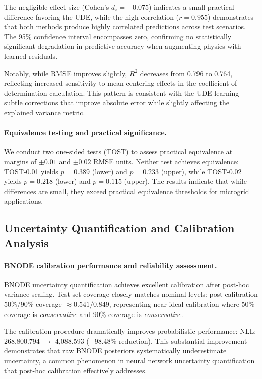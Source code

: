 The negligible effect size (Cohen's $d_z = -0.075$) indicates a small practical difference favoring the UDE, while the high correlation ($r = 0.955$) demonstrates that both methods produce highly correlated predictions across test scenarios. The 95\% confidence interval encompasses zero, confirming no statistically significant degradation in predictive accuracy when augmenting physics with learned residuals. %

Notably, while RMSE improves slightly, $R^2$ decreases from 0.796 to 0.764, reflecting increased sensitivity to mean-centering effects in the coefficient of determination calculation. This pattern is consistent with the UDE learning subtle corrections that improve absolute error while slightly affecting the explained variance metric. %

\paragraph{Equivalence testing and practical significance.} We conduct two one-sided tests (TOST) to assess practical equivalence at margins of $\pm 0.01$ and $\pm 0.02$ RMSE units. Neither test achieves equivalence: TOST-0.01 yields $p = 0.389$ (lower) and $p = 0.233$ (upper), while TOST-0.02 yields $p = 0.218$ (lower) and $p = 0.115$ (upper). The results indicate that while differences are small, they exceed practical equivalence thresholds for microgrid applications. %

\subsection{Uncertainty Quantification and Calibration Analysis}

\paragraph{BNODE calibration performance and reliability assessment.} BNODE uncertainty quantification achieves excellent calibration after post-hoc variance scaling. Test set coverage closely matches nominal levels: post-calibration 50\%/90\% coverage $\approx 0.541/0.849$, representing near-ideal calibration where 50\% coverage is \emph{conservative} and 90\% coverage is \emph{conservative}. %

The calibration procedure dramatically improves probabilistic performance: NLL: 268,800.794 $\to$ 4,088.593 ($-98.48$\% reduction). This substantial improvement demonstrates that raw BNODE posteriors systematically underestimate uncertainty, a common phenomenon in neural network uncertainty quantification that post-hoc calibration effectively addresses. %


